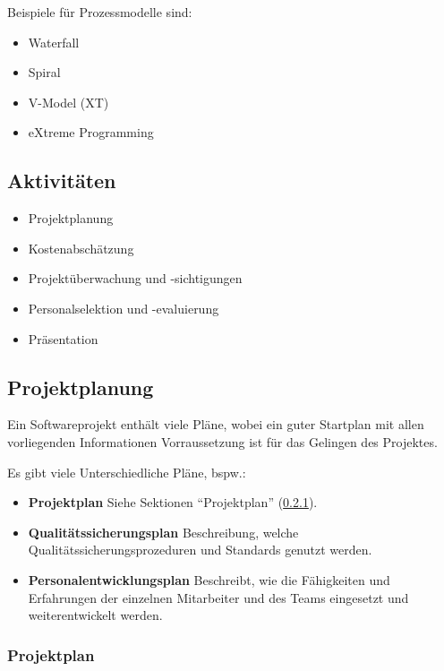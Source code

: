 			Beispiele für Prozessmodelle sind:
			\begin{itemize}
				\item Waterfall
				\item Spiral
				\item V-Model (XT)
				\item eXtreme Programming
			\end{itemize}
		
		\subsection{Aktivitäten}
			\begin{itemize}
				\item Projektplanung
				\item Kostenabschätzung
				\item Projektüberwachung und -sichtigungen
				\item Personalselektion und -evaluierung
				\item Präsentation
			\end{itemize}
		
		\subsection{Projektplanung}
			Ein Softwareprojekt enthält viele Pläne, wobei ein guter Startplan mit allen vorliegenden Informationen Vorraussetzung ist für das Gelingen des Projektes.
			
			Es gibt viele Unterschiedliche Pläne, bspw.:
			\begin{itemize}
				\item \textbf{Projektplan} Siehe Sektionen \enquote{Projektplan} (\ref{ssec:projektplan}).
				\item \textbf{Qualitätssicherungsplan} Beschreibung, welche Qualitätssicherungsprozeduren und Standards genutzt werden.
				\item \textbf{Personalentwicklungsplan} Beschreibt, wie die Fähigkeiten und Erfahrungen der einzelnen Mitarbeiter und des Teams eingesetzt und weiterentwickelt werden.
			\end{itemize}
			
			\subsubsection{Projektplan}
				\label{ssec:projektplan}
				
